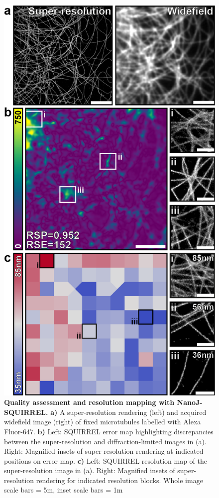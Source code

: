  \begin{figure}[!t]
    \centering
    \includegraphics{Figures/FigureSQUIRREL_v2.png}
    \caption{\textbf{Quality assessment and resolution mapping with NanoJ-SQUIRREL.} \textbf{a)} A super-resolution rendering (left) and acquired widefield image (right) of fixed microtubules labelled with Alexa Fluor-647. \textbf{b)} Left: SQUIRREL error map highlighting discrepancies between the super-resolution and diffraction-limited images in (a). Right: Magnified insets of super-resolution rendering at indicated positions on error map. \textbf{c)} Left: SQUIRREL resolution map of the super-resolution image in (a). Right: Magnified insets of super-resolution rendering for indicated resolution blocks. Whole image scale bars = 5\micro m, inset scale bars = 1\micro m}
    \label{fig:SQUIRREL}
 \end{figure}

